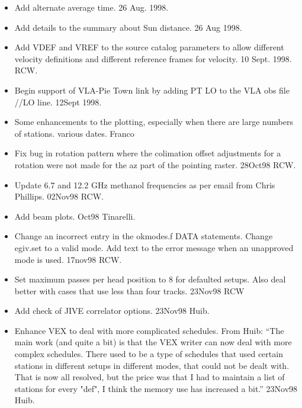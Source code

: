 \documentclass{report}
\begin{document}
\begin{itemize}
\item  Add alternate average time.  26 Aug. 1998.

\item  Add details to the summary about Sun distance.  26 Aug 1998.

\item  Add VDEF and VREF to the source catalog parameters to allow
       different velocity definitions and different reference frames for
       velocity.  10 Sept. 1998. RCW.

\item  Begin support of VLA-Pie Town link by adding PT LO to the
       VLA obs file //LO line.  12Sept 1998.

\item  Some enhancements to the plotting, especially when there are
       large numbers of stations.  various dates.  Franco

\item  Fix bug in rotation pattern where the colimation offset
       adjustments for a rotation were not made for the az part
       of the pointing raster.  28Oct98 RCW.

\item  Update 6.7 and 12.2 GHz methanol frequencies as per email from
       Chris Phillips.  02Nov98 RCW.

\item  Add beam plots.  Oct98 Tinarelli.

\item  Change an incorrect entry in the okmodes.f DATA statements.
       Change egiv.set to a valid mode.  Add text to the error
       message when an unapproved mode is used.  17nov98 RCW.

\item  Set maximum passes per head position to 8 for defaulted
       setups.  Also deal better with cases that use less than
       four tracks.  23Nov98 RCW

\item  Add check of JIVE correlator options.  23Nov98 Huib.

\item  Enhance VEX to deal with more complicated schedules.
       From Huib: ``The main work (and quite a bit) is that the
       VEX writer can now deal with more complex schedules. There
       used to be a type of schedules that used certain stations in
       different setups in different modes, that could not be dealt
       with. That is now all resolved, but the price was that I had
       to maintain a list of stations for every "def", I think the
       memory use has increased a bit.''  23Nov98  Huib.


\end{itemize}
\end{document}
